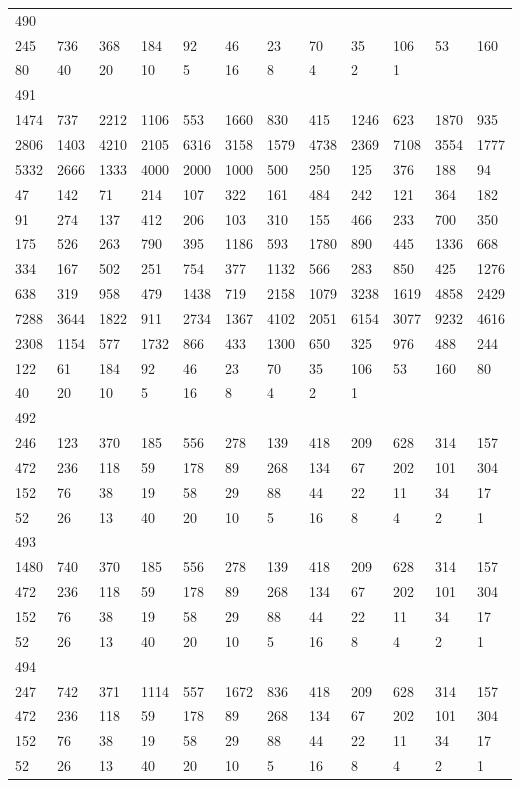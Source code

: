 \begin{longtable}{llllllllllll}
490&&&&&&&&&&&\\
245& 736& 368& 184& 92& 46& 23& 70& 35& 106& 53& 160\\
80& 40& 20& 10& 5& 16& 8& 4& 2& 1& \\

491&&&&&&&&&&&\\
1474& 737& 2212& 1106& 553& 1660& 830& 415& 1246& 623& 1870& 935\\
2806& 1403& 4210& 2105& 6316& 3158& 1579& 4738& 2369& 7108& 3554& 1777\\
5332& 2666& 1333& 4000& 2000& 1000& 500& 250& 125& 376& 188& 94\\
47& 142& 71& 214& 107& 322& 161& 484& 242& 121& 364& 182\\
91& 274& 137& 412& 206& 103& 310& 155& 466& 233& 700& 350\\
175& 526& 263& 790& 395& 1186& 593& 1780& 890& 445& 1336& 668\\
334& 167& 502& 251& 754& 377& 1132& 566& 283& 850& 425& 1276\\
638& 319& 958& 479& 1438& 719& 2158& 1079& 3238& 1619& 4858& 2429\\
7288& 3644& 1822& 911& 2734& 1367& 4102& 2051& 6154& 3077& 9232& 4616\\
2308& 1154& 577& 1732& 866& 433& 1300& 650& 325& 976& 488& 244\\
122& 61& 184& 92& 46& 23& 70& 35& 106& 53& 160& 80\\
40& 20& 10& 5& 16& 8& 4& 2& 1& \\

492&&&&&&&&&&&\\
246& 123& 370& 185& 556& 278& 139& 418& 209& 628& 314& 157\\
472& 236& 118& 59& 178& 89& 268& 134& 67& 202& 101& 304\\
152& 76& 38& 19& 58& 29& 88& 44& 22& 11& 34& 17\\
52& 26& 13& 40& 20& 10& 5& 16& 8& 4& 2& 1\\

493&&&&&&&&&&&\\
1480& 740& 370& 185& 556& 278& 139& 418& 209& 628& 314& 157\\
472& 236& 118& 59& 178& 89& 268& 134& 67& 202& 101& 304\\
152& 76& 38& 19& 58& 29& 88& 44& 22& 11& 34& 17\\
52& 26& 13& 40& 20& 10& 5& 16& 8& 4& 2& 1\\

494&&&&&&&&&&&\\
247& 742& 371& 1114& 557& 1672& 836& 418& 209& 628& 314& 157\\
472& 236& 118& 59& 178& 89& 268& 134& 67& 202& 101& 304\\
152& 76& 38& 19& 58& 29& 88& 44& 22& 11& 34& 17\\
52& 26& 13& 40& 20& 10& 5& 16& 8& 4& 2& 1\\


\end{longtable}
